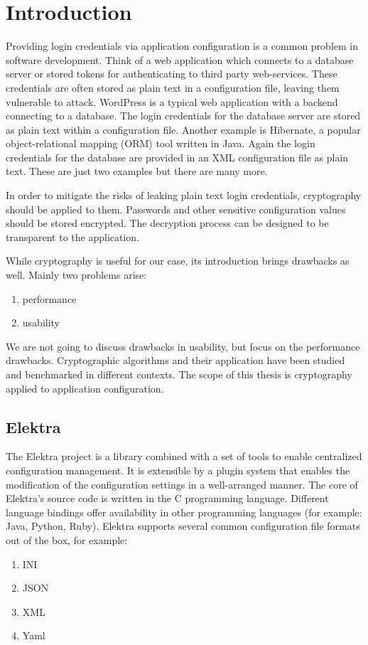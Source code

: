 \chapter{Introduction}

Providing login credentials via application configuration is a common problem in software development.
Think of a web application which connects to a database server or stored tokens for authenticating to third party web-services.
These credentials are often stored as plain text in a configuration file, leaving them vulnerable to attack.
WordPress is a typical web application with a backend connecting to a database.
The login credentials for the database server are stored as plain text within a configuration file.\cite{wordpress-doc}
Another example is Hibernate, a popular object-relational mapping (ORM) tool written in Java.
Again the login credentials for the database are provided in an XML configuration file as plain text.\cite{hibernate-doc}
These are just two examples but there are many more.

In order to mitigate the risks of leaking plain text login credentials, cryptography should be applied to them.
Passwords and other sensitive configuration values should be stored encrypted.
The decryption process can be designed to be transparent to the application.

While cryptography is useful for our case, its introduction brings drawbacks as well.
Mainly two problems arise:
\begin{enumerate}
\item performance
\item usability
\end{enumerate}

We are not going to discuss drawbacks in usability, but focus on the performance drawbacks.
Cryptographic algorithms and their application have been studied and benchmarked in different contexts.\cite{thakur2011aes,ocf,freebsdtls}
The scope of this thesis is cryptography applied to application configuration.

\section{Elektra}

The Elektra project is a library combined with a set of tools to enable centralized configuration management.
It is extensible by a plugin system that enables the modification of the configuration settings in a well-arranged manner.
The core of Elektra's source code is written in the C programming language.
Different language bindings offer availability in other programming languages (for example: Java, Python, Ruby).
Elektra supports several common configuration file formats out of the box, for example:\cite{raab2010thesis,elektra-doc}
\begin{enumerate}
\item INI
\item JSON
\item XML
\item Yaml
\end{enumerate}

